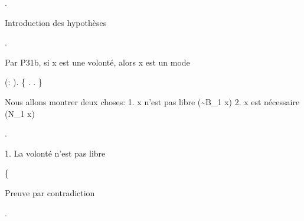 \documentclass[10pt]{report}
\begin{document}
\begin{coqdoccode}
\coqdocnoindent
{}.\coqdoceol
\coqdocindent{1.00em}
\begin{coqdoccomment}
\coqdocindent{0.50em}
Introduction\coqdocindent{0.50em}
des\coqdocindent{0.50em}
hypothèses\coqdocindent{0.50em}
\end{coqdoccomment}
\coqdoceol
\coqdocindent{1.00em}
  .\coqdoceol
\coqdocemptyline
\coqdocindent{1.00em}
\begin{coqdoccomment}
\coqdocindent{0.50em}
Par\coqdocindent{0.50em}
P31b,\coqdocindent{0.50em}
si\coqdocindent{0.50em}
x\coqdocindent{0.50em}
est\coqdocindent{0.50em}
une\coqdocindent{0.50em}
volonté,\coqdocindent{0.50em}
alors\coqdocindent{0.50em}
x\coqdocindent{0.50em}
est\coqdocindent{0.50em}
un\coqdocindent{0.50em}
mode\coqdocindent{0.50em}
\end{coqdoccomment}
\coqdoceol
\coqdocindent{1.00em}
 (:  ).\coqdoceol
\coqdocindent{1.00em}
\{  .  . \}\coqdoceol
\coqdocindent{1.00em}
\coqdoceol
\coqdocindent{1.00em}
\begin{coqdoccomment}
\coqdocindent{0.50em}
Nous\coqdocindent{0.50em}
allons\coqdocindent{0.50em}
montrer\coqdocindent{0.50em}
deux\coqdocindent{0.50em}
choses:\coqdoceol
\coqdocindent{2.50em}
1.\coqdocindent{0.50em}
x\coqdocindent{0.50em}
n'est\coqdocindent{0.50em}
pas\coqdocindent{0.50em}
libre\coqdocindent{0.50em}
(\~{}B\_1\coqdocindent{0.50em}
x)\coqdoceol
\coqdocindent{2.50em}
2.\coqdocindent{0.50em}
x\coqdocindent{0.50em}
est\coqdocindent{0.50em}
nécessaire\coqdocindent{0.50em}
(N\_1\coqdocindent{0.50em}
x)\coqdocindent{0.50em}
\end{coqdoccomment}
\coqdoceol
\coqdocindent{1.00em}
.\coqdoceol
\coqdocemptyline
\coqdocindent{1.00em}
\begin{coqdoccomment}
\coqdocindent{0.50em}
1.\coqdocindent{0.50em}
La\coqdocindent{0.50em}
volonté\coqdocindent{0.50em}
n'est\coqdocindent{0.50em}
pas\coqdocindent{0.50em}
libre\coqdocindent{0.50em}
\end{coqdoccomment}
\coqdoceol
\coqdocindent{1.00em}
\{\coqdoceol
\coqdocindent{2.00em}
\begin{coqdoccomment}
\coqdocindent{0.50em}
Preuve\coqdocindent{0.50em}
par\coqdocindent{0.50em}
contradiction\coqdocindent{0.50em}
\end{coqdoccomment}
\coqdoceol
\coqdocindent{2.00em}
 .\coqdoceol

\end{coqdoccode}
\end{document}
